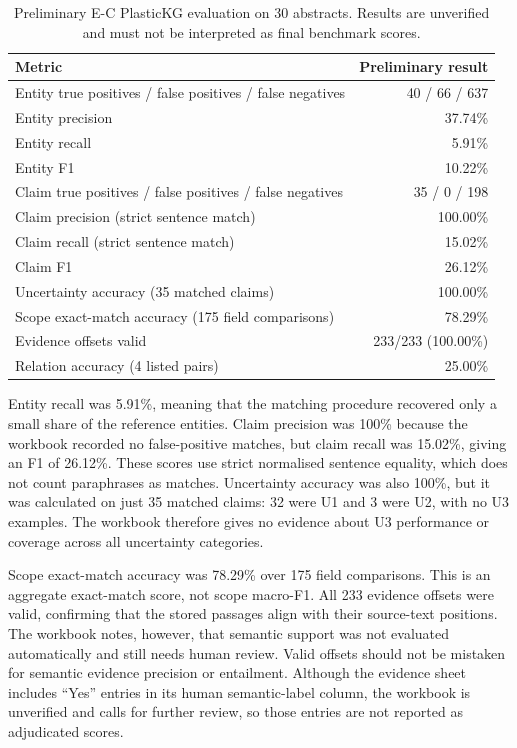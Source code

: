 \documentclass[11pt,a4paper]{article}
\begin{document}
\begin{table}[htbp]
\centering
\caption{Preliminary E-C PlasticKG evaluation on 30 abstracts. Results are unverified and must not be interpreted as final benchmark scores.}
\label{tab:preliminarymetrics}
\small
\begin{tabularx}{\linewidth}{>{\raggedright\arraybackslash}Xr}
\toprule
\textbf{Metric} & \textbf{Preliminary result}\\
\midrule
Entity true positives / false positives / false negatives & 40 / 66 / 637\\
Entity precision & 37.74\%\\
Entity recall & 5.91\%\\
Entity F1 & 10.22\%\\
Claim true positives / false positives / false negatives & 35 / 0 / 198\\
Claim precision (strict sentence match) & 100.00\%\\
Claim recall (strict sentence match) & 15.02\%\\
Claim F1 & 26.12\%\\
Uncertainty accuracy (35 matched claims) & 100.00\%\\
Scope exact-match accuracy (175 field comparisons) & 78.29\%\\
Evidence offsets valid & 233/233 (100.00\%)\\
Relation accuracy (4 listed pairs) & 25.00\%\\
\bottomrule
\end{tabularx}
\end{table}

Entity recall was 5.91\%, meaning that the matching procedure recovered only a small share of the reference entities. Claim precision was 100\% because the workbook recorded no false-positive matches, but claim recall was 15.02\%, giving an F1 of 26.12\%. These scores use strict normalised sentence equality, which does not count paraphrases as matches. Uncertainty accuracy was also 100\%, but it was calculated on just 35 matched claims: 32 were U1 and 3 were U2, with no U3 examples. The workbook therefore gives no evidence about U3 performance or coverage across all uncertainty categories.

Scope exact-match accuracy was 78.29\% over 175 field comparisons. This is an aggregate exact-match score, not scope macro-F1. All 233 evidence offsets were valid, confirming that the stored passages align with their source-text positions. The workbook notes, however, that semantic support was not evaluated automatically and still needs human review. Valid offsets should not be mistaken for semantic evidence precision or entailment. Although the evidence sheet includes ``Yes'' entries in its human semantic-label column, the workbook is unverified and calls for further review, so those entries are not reported as adjudicated scores.
\end{document}
